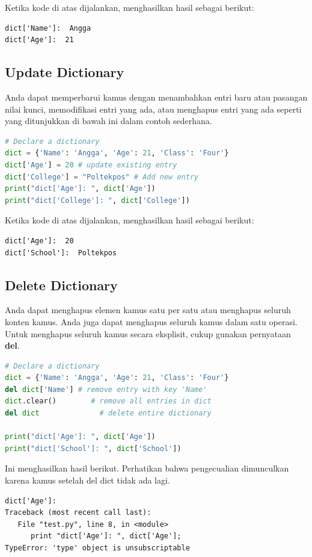 Ketika kode di atas dijalankan, menghasilkan hasil sebagai berikut:
\begin{lstlisting}[caption= Hasil Implementasi Hash Table]
dict['Name']:  Angga
dict['Age']:  21
\end{lstlisting}


\subsection{Update Dictionary}
Anda dapat memperbarui kamus dengan menambahkan entri baru atau pasangan nilai kunci, memodifikasi entri yang ada, atau menghapus entri yang ada seperti yang ditunjukkan di bawah ini dalam contoh sederhana.
\begin{lstlisting}[language=Python, caption=Implementasi Update Hash Table]
# Declare a dictionary
dict = {'Name': 'Angga', 'Age': 21, 'Class': 'Four'}
dict['Age'] = 20 # update existing entry
dict['College'] = "Poltekpos" # Add new entry
print("dict['Age']: ", dict['Age'])
print("dict['College']: ", dict['College'])
\end{lstlisting}

Ketika kode di atas dijalankan, menghasilkan hasil sebagai berikut:
\begin{lstlisting}[caption= Hasil Implementasi Update Hash Table]
dict['Age']:  20
dict['School']:  Poltekpos
\end{lstlisting}

\subsection{Delete Dictionary}
Anda dapat menghapus elemen kamus satu per satu atau menghapus seluruh konten kamus. Anda juga dapat menghapus seluruh kamus dalam satu operasi. Untuk menghapus seluruh kamus secara eksplisit, cukup gunakan pernyataan \textbf{del}.
\begin{lstlisting}[language=Python, caption=Implementasi Delete Hash Table]
# Declare a dictionary
dict = {'Name': 'Angga', 'Age': 21, 'Class': 'Four'}
del dict['Name'] # remove entry with key 'Name'
dict.clear()        # remove all entries in dict
del dict              # delete entire dictionary

print("dict['Age']: ", dict['Age'])
print("dict['School']: ", dict['School'])
\end{lstlisting}

Ini menghasilkan hasil berikut. Perhatikan bahwa pengecualian dimunculkan karena kamus setelah del dict tidak ada lagi.
\begin{lstlisting}[caption= Hasil Implementasi Delete Hash Table]
dict['Age']:
Traceback (most recent call last):
   File "test.py", line 8, in <module>
      print "dict['Age']: ", dict['Age'];
TypeError: 'type' object is unsubscriptable
\end{lstlisting}
